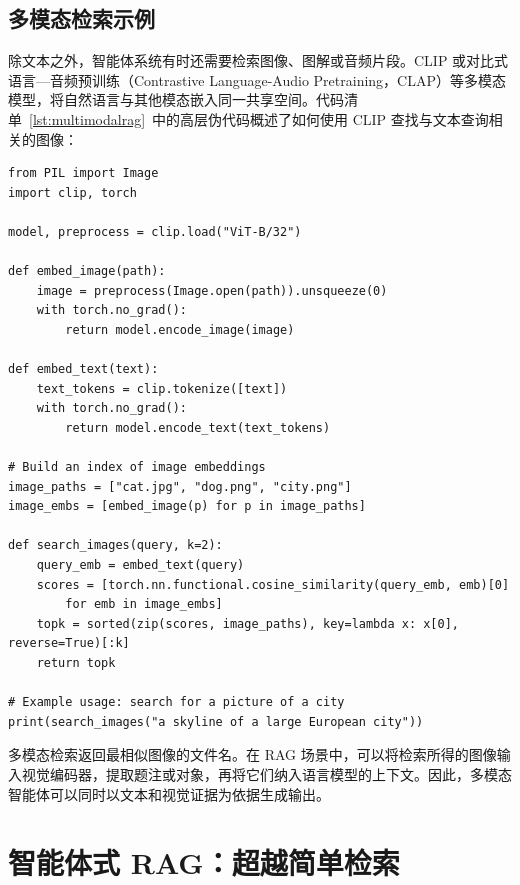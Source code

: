 \subsection{多模态检索示例}
除文本之外，智能体系统有时还需要检索图像、图解或音频片段。CLIP 或对比式语言—音频预训练（Contrastive Language-Audio Pretraining，CLAP）等多模态模型，将自然语言与其他模态嵌入同一共享空间。代码清单~\ref{lst:multimodalrag}~中的高层伪代码概述了如何使用 CLIP 查找与文本查询相关的图像：


\begin{listing}[!ht]
\begin{verbatim}
from PIL import Image
import clip, torch

model, preprocess = clip.load("ViT-B/32")

def embed_image(path):
    image = preprocess(Image.open(path)).unsqueeze(0)
    with torch.no_grad():
        return model.encode_image(image)

def embed_text(text):
    text_tokens = clip.tokenize([text])
    with torch.no_grad():
        return model.encode_text(text_tokens)

# Build an index of image embeddings
image_paths = ["cat.jpg", "dog.png", "city.png"]
image_embs = [embed_image(p) for p in image_paths]

def search_images(query, k=2):
    query_emb = embed_text(query)
    scores = [torch.nn.functional.cosine_similarity(query_emb, emb)[0] 
        for emb in image_embs]
    topk = sorted(zip(scores, image_paths), key=lambda x: x[0], reverse=True)[:k]
    return topk

# Example usage: search for a picture of a city
print(search_images("a skyline of a large European city"))
\end{verbatim}
\caption{在 Python 中使用 CLIP 查找相关图像的示例}
\label{lst:multimodalrag}
\end{listing}

多模态检索返回最相似图像的文件名。在 RAG 场景中，可以将检索所得的图像输入视觉编码器，提取题注或对象，再将它们纳入语言模型的上下文。因此，多模态智能体可以同时以文本和视觉证据为依据生成输出。



\section{智能体式 RAG：超越简单检索}
\label{sec:agentic_rag}

